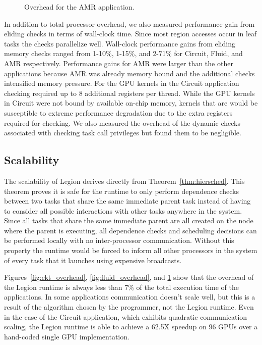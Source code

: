 \begin{figure}
\begin{center}
{\label{fig:amr16384}
}
\end{center}
\vspace{-2mm}
\caption{Overhead for the AMR application.\label{fig:amr_overhead}}
\vspace{-6mm}
\end{figure}

In addition to total processor overhead, we also measured performance gain from eliding checks in 
terms of wall-clock time.  Since most region accesses occur in leaf tasks the checks parallelize 
well.  Wall-clock performance gains from eliding memory checks ranged from 1-10\%, 1-15\%, 
and 2-71\% for Circuit, Fluid, and AMR respectively.  Performance gains for AMR were larger than
the other applications because AMR was already memory bound and the additional checks intensified
memory pressure.  For the GPU kernels in the Circuit application checking required up to 8 additional 
registers per thread.  While the GPU kernels in Circuit were not bound by 
available on-chip memory, kernels that are would be susceptible to extreme performance 
degradation due to the extra registers required for checking.  We also measured the overhead
of the dynamic checks associated with checking task call privileges but found them to be negligible.

\subsection{Scalability}
\label{subsec:scalability}
The scalability of Legion derives directly from Theorem~\ref{thm:hiersched}.  This 
theorem proves it is safe for the runtime to only perform dependence checks between two
tasks that share the same immediate parent task instead of having to consider all
possible interactions with other tasks anywhere in the system.  Since all tasks that
share the same immediate parent are all created on the node where the parent is executing,
all dependence checks and scheduling decisions can be performed locally with no inter-processor communication.  
Without this property the runtime would be forced to inform all other processors in the system 
of every task that it launches using expensive broadcasts. 

Figures~\ref{fig:ckt_overhead}, \ref{fig:fluid_overhead}, and \ref{fig:amr_overhead} show that
the overhead of the Legion runtime is always less than 7\% of the total execution time
of the applications.  In some applications communication doesn't scale well, but this is
a result of the algorithm chosen by the programmer, not the Legion runtime.
Even in the case of the Circuit application, which exhibits quadratic communication scaling, the Legion
runtime is able to achieve a 62.5X speedup on 96 GPUs over a hand-coded single GPU implementation\cite{Legion12}.

